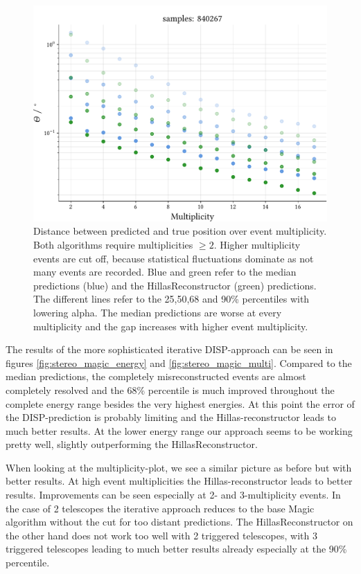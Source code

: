 \begin{figure}
    \centering
    \captionsetup{width=0.9\linewidth}
    \includegraphics[width=0.9\linewidth]{../analysis/plots/gamma/median_vs_multi_comp.pdf}
    \caption{Distance between predicted and true position over event multiplicity. Both algorithms require
    multiplicities $\geq 2$. Higher multiplicity events are cut off, because 
    statistical fluctuations dominate as not many events are recorded.
    Blue and green refer to the median predictions (blue) and the HillasReconstructor (green) predictions.
    The different lines refer to the 25,50,68 and 90\% percentiles with 
    lowering alpha.
    The median predictions are worse at every multiplicity and the gap increases with higher event multiplicity.}
    \label{fig:stereo_median_multi}
\end{figure}

The results of the more sophisticated iterative DISP-approach can be seen in figures
\ref{fig:stereo_magic_energy} and \ref{fig:stereo_magic_multi}.
Compared to the median predictions, the completely misreconstructed events are almost
completely resolved and the 68\% percentile is much improved throughout the complete energy range besides 
the very highest energies. At this point the error of the DISP-prediction is probably limiting and the 
Hillas-reconstructor leads to much better results.
At the lower energy range our approach seems to be working pretty well, 
slightly outperforming the HillasReconstructor.

When looking at the multiplicity-plot, we see a similar picture as before but with 
better results. At high event multiplicities the Hillas-reconstructor 
leads to better results. Improvements can be seen especially at 2- and 3-multiplicity 
events. In the case of 2 telescopes the iterative approach reduces to the 
base Magic algorithm without the cut for too distant predictions.
The HillasReconstructor on the other hand does not work too well with 2 
triggered telescopes, with 3 triggered telescopes leading to much better results 
already especially at the 90\% percentile.


